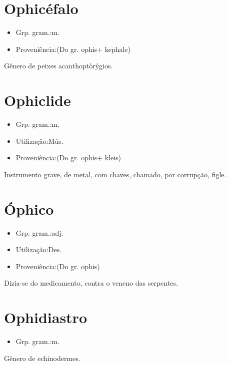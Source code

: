 \section{Ophicéfalo}
\begin{itemize}
\item {Grp. gram.:m.}
\end{itemize}
\begin{itemize}
\item {Proveniência:(Do gr. \textunderscore ophis\textunderscore  + \textunderscore kephale\textunderscore )}
\end{itemize}
Gênero de peixes acanthoptòrýgios.
\section{Ophiclide}
\begin{itemize}
\item {Grp. gram.:m.}
\end{itemize}
\begin{itemize}
\item {Utilização:Mús.}
\end{itemize}
\begin{itemize}
\item {Proveniência:(Do gr. \textunderscore ophis\textunderscore  + \textunderscore kleis\textunderscore )}
\end{itemize}
Instrumento grave, de metal, com chaves, chamado, por corrupção, \textunderscore figle\textunderscore .
\section{Óphico}
\begin{itemize}
\item {Grp. gram.:adj.}
\end{itemize}
\begin{itemize}
\item {Utilização:Des.}
\end{itemize}
\begin{itemize}
\item {Proveniência:(Do gr. \textunderscore ophis\textunderscore )}
\end{itemize}
Dizia-se do medicamento, contra o veneno das serpentes.
\section{Ophidiastro}
\begin{itemize}
\item {Grp. gram.:m.}
\end{itemize}
Gênero de echinodermes.
